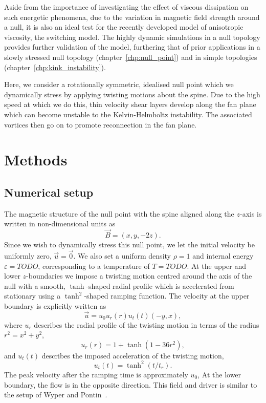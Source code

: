 Aside from the importance of investigating the effect of viscous dissipation on such energetic phenomena, due to the variation in magnetic field strength around a null, it is also an ideal test for the recently developed model of anisotropic viscosity, the switching model. The highly dynamic simulations in a null topology provides further validation of the model, furthering that of prior applications in a slowly stressed null topology (chapter~\ref{chp:null_point}) and in simple topologies (chapter~\ref{chp:kink_instability}).

Here, we consider a rotationally symmetric, idealised null point which we dynamically stress by applying twisting motions about the spine. Due to the high speed at which we do this, thin velocity shear layers develop along the fan plane which can become unstable to the Kelvin-Helmholtz instability. The associated vortices then go on to promote reconnection in the fan plane. 

\section{Methods}

\subsection{Numerical setup}

The magnetic structure of the null point with the spine aligned along the $z$-axis is written in non-dimensional units as
\begin{equation}
  \label{eq:null_point_field}
  \vec{B} = (x, y, -2z).
\end{equation}
Since we wish to dynamically stress this null point, we let the initial velocity be uniformly zero, $\vec{u} = \vec{0}$. We also set a uniform density $\rho = 1$ and internal energy $\varepsilon = TODO$, corresponding to a temperature of $T = TODO$. At the upper and lower $z$-boundaries we impose a twisting motion centred around the axis of the null with a smooth, $\tanh$-shaped radial profile which is accelerated from stationary using a $\tanh^2$-shaped ramping function. The velocity at the upper boundary is explicitly written as
\begin{equation}
  \label{eq:null_twisting_profile}
  \vec{u} = u_0 u_r(r) u_t(t) (-y, x),
\end{equation}
where $u_r$ describes the radial profile of the twisting motion in terms of the radius $r^2 = x^2 + y^2$,
\begin{equation}
  \label{eq:radial_twisting_function}
  u_r(r) = 1 + \tanh(1 - 36r^2),
\end{equation}
and $u_t(t)$ describes the imposed acceleration of the twisting motion,
\begin{equation}
  \label{eq:ramping_up_function}
  u_t(t) = \tanh^2(t/t_r).
\end{equation}
The peak velocity after the ramping time is approximately $u_0$, At the lower boundary, the flow is in the opposite direction. This field and driver is similar to the setup of Wyper and Pontin~\cite{wyperKelvinHelmholtzInstabilityCurrentvortex2013}. 

